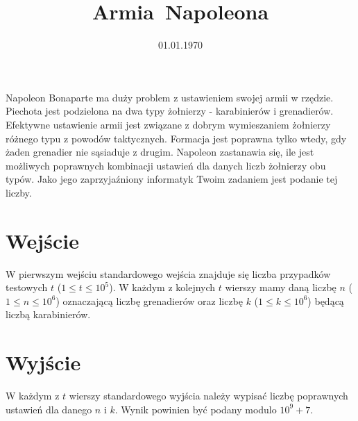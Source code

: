 
\pagestyle{fancy}
\date{01.01.1970}
\title{\mbox{Armia Napoleona}}



\begin{tasktext}%
    \noindent
    Napoleon Bonaparte ma duży problem z ustawieniem swojej armii w rzędzie.
    Piechota jest podzielona na dwa typy żołnierzy - karabinierów i grenadierów.
    Efektywne ustawienie armii jest związane z dobrym wymieszaniem żołnierzy różnego typu z powodów taktycznych.
    Formacja jest poprawna tylko wtedy, gdy żaden grenadier nie sąsiaduje z drugim.
    Napoleon zastanawia się, ile jest możliwych poprawnych kombinacji ustawień dla danych liczb żołnierzy obu typów.
    Jako jego zaprzyjaźniony informatyk Twoim zadaniem jest podanie tej liczby.
	
    \section{Wejście}
	W pierwszym wejściu standardowego wejścia znajduje się liczba przypadków testowych $t$ ($1 \leqslant t \leqslant 10^{5}$).
	W każdym z kolejnych $t$ wierszy mamy daną liczbę $n$ ($1 \leqslant n \leqslant 10^6$) oznaczającą liczbę grenadierów oraz liczbę $k$ ($1 \leqslant k \leqslant 10^6$) będącą liczbą karabinierów.

	\section{Wyjście}
	W każdym z $t$ wierszy standardowego wyjścia należy wypisać liczbę poprawnych ustawień dla danego $n$ i $k$.
	Wynik powinien być podany modulo $10^9+7$.
	
	\oigprzyklady
\end{tasktext}

